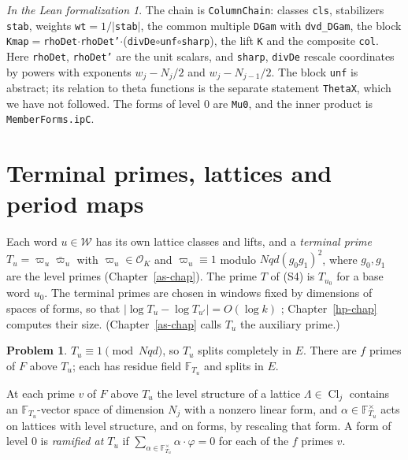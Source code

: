 \documentclass[reqno]{amsart}
\newcounter{chap}
\theoremstyle{definition}
\newtheorem{problem}{Problem}[section]
\theoremstyle{plain}
\theoremstyle{remark}
\newtheorem*{leanremark}{In the Lean formalization}
\newcommand{\Oc}{\mathcal O}
\newcommand{\Wc}{\mathcal W}
\newcommand{\Cl}{\operatorname{Cl}}
\newcommand{\tl}[1]{\texttt{#1}}
\begin{document}
\begin{leanremark}
\raggedright The chain is \tl{ColumnChain}: classes \tl{cls}, stabilizers \tl{stab}, weights \tl{wt}\({}=1/\lvert\)\tl{stab}\(\rvert\), the common multiple \tl{DGam} with \tl{dvd\_DGam}, the block \tl{Kmap}\({}=\)\tl{rhoDet}\(\cdot\)\tl{rhoDet'}\(\cdot\)(\tl{divDe}\(\circ\)\tl{unf}\(\circ\)\tl{sharp}), the lift \tl{K} and the composite \tl{col}.  Here \tl{rhoDet}, \tl{rhoDet'} are the unit scalars, and \tl{sharp}, \tl{divDe} rescale coordinates by powers with exponents \(w_j-N_j/2\) and \(w_j-N_{j-1}/2\).  The block \tl{unf} is abstract; its relation to theta functions is the separate statement \tl{ThetaX}, which we have not followed.  The forms of level \(0\) are \tl{Mu0}, and the inner product is \tl{MemberForms.ipC}.
\end{leanremark}

\section{Terminal primes, lattices and period maps}\label{sec:lattices}

Each word \(u\in\Wc\) has its own lattice classes and lifts, and a \emph{terminal prime} \(T_u=\varpi_u\bar\varpi_u\) with \(\varpi_u\in\Oc_K\) and \(\varpi_u\equiv1\) modulo \(Nqd(g_0g_1)^2\), where \(g_0,g_1\) are the level primes (Chapter~\ref{as-chap}).  The prime \(T\) of (S4) is \(T_{u_0}\) for a base word \(u_0\).  The terminal primes are chosen in windows fixed by dimensions of spaces of forms, so that \(\lvert\log T_u-\log T_{u'}\rvert=O(\log k)\) \cite[Def.~18.9 (K7)]{Adr}; Chapter~\ref{hp-chap} computes their size.  (Chapter~\ref{as-chap} calls \(T_u\) the auxiliary prime.)

\begin{problem}\label{pr:Tu-split}
\(T_u\equiv1\pmod{Nqd}\), so \(T_u\) splits completely in \(E\).  There are \(f\) primes of \(F\) above \(T_u\); each has residue field \(\mathbb F_{T_u}\) and splits in \(E\).
\end{problem}

At each prime \(v\) of \(F\) above \(T_u\) the level structure of a lattice \(\Lambda\in\Cl_j\) contains an \(\mathbb F_{T_u}\)-vector space of dimension \(N_j\) with a nonzero linear form, and \(\alpha\in\mathbb F_{T_u}^\times\) acts on lattices with level structure, and on forms, by rescaling that form.  A form of level \(0\) is \emph{ramified at \(T_u\)} if \(\sum_{\alpha\in\mathbb F_{T_u}^\times}\alpha\cdot\varphi=0\) for each of the \(f\) primes \(v\).
\end{document}
